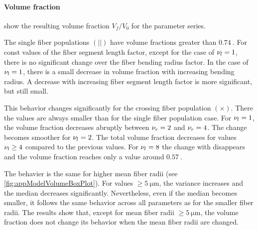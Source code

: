 \paragraph{Volume fraction}
% 
 show the resulting volume fraction $V_f/V_0$ for the parameter series.
\par
% 
The single fiber populations $(||)$ have volume fractions greater than $\SI{0.74}{}$.
For const values of the fiber segment length factor, except for the case of $\textnormal{$\nu_{l}$} = \SI{1}{}$, there is no significant change over the fiber bending radius factor.
In the case of $\textnormal{$\nu_{l}$} = \SI{1}{}$, there is a small decrease in volume fraction with increasing bending radius.
A decrease with increasing fiber segment length factor \segLengthFactor{} is more significant, but still small.
\par
% 
This behavior changes significantly for the crossing fiber population $(\times)$.
There the values are always smaller than for the single fiber population case.
For $\textnormal{$\nu_{l}$}{}=\SI{1}{}$, the volume fraction decreases abruptly between $\textnormal{$\nu_{r}$}{} = \SI{2}{}$ and $\textnormal{$\nu_{r}$}{} = \SI{4}{}$. 
The change becomes smoother for $\textnormal{$\nu_{l}$}{}=\SI{2}{}$.
The total volume fraction decreases for values $\textnormal{$\nu_{l}$}{} \geq \SI{4}{}$ compared to the previous values.
For $\textnormal{$\nu_{l}$}{}=\SI{8}{}$ the change with \segRadiusFactor{} disappears and the volume fraction reaches only a value around $\SI{0.57}{}$.
\par
% 
The behavier is the same for higher mean fiber radii (see \cref{fig:appModelVolumeBoxPlot}). For values $\geq \SI{5}{\micro\meter}$, the variance increases and the median decreases significantly.
Nevertheless, even if the median becomes smaller, it follows the same behavior across all parameters as for the smaller fiber radii.
The results show that, except for mean fiber radii $\geq \SI{5}{\micro\meter}$, the volume fraction does not change its behavior when the mean fiber radii are changed.
\par
% 
% 
% 
